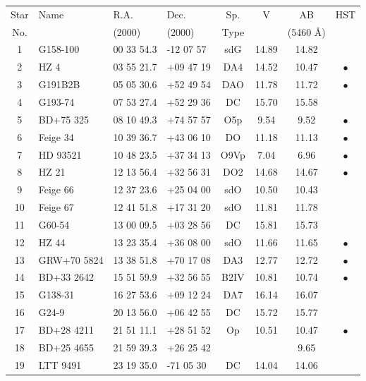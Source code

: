 \documentclass[11pt,twoside]{article}
\begin{document}
\begin{table}[htbp]

\begin{center}
\begin{tabular}{clllcccc}
Star &  Name     &   R.A.      &   Dec.     & Sp.  &   V    &  AB   & HST \\
No.  &           &  (2000)     &  (2000)    & Type & & (5460 \AA) & \\ \hline
1  & G158-100    & 00 33 54.3  & -12 07 57  & sdG  & 14.89  & 14.82 & \\
2  & HZ 4        & 03 55 21.7  & +09 47 19  & DA4  & 14.52  & 10.47 & $\bullet$ \\
3  & G191B2B     & 05 05 30.6  & +52 49 54  & DAO  & 11.78  & 11.72 & $\bullet$ \\
4  & G193-74     & 07 53 27.4  & +52 29 36  & DC   & 15.70  & 15.58 & \\
5  & BD+75 325   & 08 10 49.3  & +74 57 57  & O5p  &  9.54  &  9.52 & $\bullet$ \\
6  & Feige 34    & 10 39 36.7  & +43 06 10  & DO   & 11.18  & 11.13 & $\bullet$ \\
7  & HD 93521    & 10 48 23.5  & +37 34 13  & O9Vp &  7.04  &  6.96 & $\bullet$ \\
8  & HZ 21       & 12 13 56.4  & +32 56 31  & DO2  & 14.68  & 14.67 & $\bullet$ \\
9  & Feige 66    & 12 37 23.6  & +25 04 00  & sdO  & 10.50  & 10.43 & \\
10 & Feige 67    & 12 41 51.8  & +17 31 20  & sdO  & 11.81  & 11.78 & \\
11 & G60-54      & 13 00 09.5  & +03 28 56  & DC   & 15.81  & 15.73 & \\
12 & HZ 44       & 13 23 35.4  & +36 08 00  & sdO  & 11.66  & 11.65 & $\bullet$ \\
13 & GRW+70 5824 & 13 38 51.8  & +70 17 08  & DA3  & 12.77  & 12.72 & $\bullet$ \\
14 & BD+33 2642  & 15 51 59.9  & +32 56 55  & B2IV & 10.81  & 10.74 & $\bullet$ \\
15 & G138-31     & 16 27 53.6  & +09 12 24  & DA7  & 16.14  & 16.07 & \\
16 & G24-9       & 20 13 56.0  & +06 42 55  & DC   & 15.72  & 15.77 & \\
17 & BD+28 4211  & 21 51 11.1  & +28 51 52  & Op   & 10.51  & 10.47 & $\bullet$ \\
18 & BD+25 4655  & 21 59 39.3  & +26 25 42  &      &        &  9.65 & \\
19 & LTT 9491    & 23 19 35.0  & -71 05 30  & DC   & 14.04  & 14.06 & \\

\end{tabular}
\end{center}
\end{table}
\end{document}

